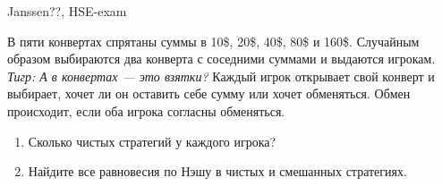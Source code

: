\begin{problem}
\begin{source}
Janssen??, HSE-exam
\end{source}
В пяти конвертах спрятаны суммы в 10\$, 20\$, 40\$, 80\$ и 160\$. Случайным образом выбираются два конверта с соседними суммами и выдаются игрокам. {\it Тигр: А в конвертах --- это взятки?} Каждый игрок открывает свой конверт и выбирает, хочет ли он оставить себе сумму или хочет обменяться. Обмен происходит, если оба игрока согласны обменяться.\par
\begin{enumerate}
\item	Сколько чистых стратегий у каждого игрока?\par
\item 	Найдите все равновесия по Нэшу в чистых и смешанных стратегиях.
\end{enumerate}


\begin{sol}

\end{sol}
\end{problem}


